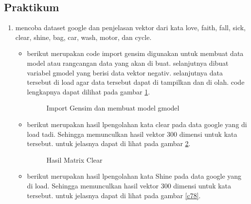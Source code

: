 \subsection{Praktikum}
\begin{enumerate}
\item mencoba dataset google dan penjelasan vektor dari kata love, faith, fall, sick, clear, shine, bag, car, wash, motor, dan cycle.\par

\begin{itemize}
\item berikut merupakan code import gensim digunakan untuk membuat data model atau rangcangan data yang akan di buat. selanjutnya dibuat variabel gmodel yang berisi data vektor negativ. selanjutnya data tersebut di load agar data tersebut dapat di tampilkan dan di olah. code lengkapnya dapat dilihat pada gambar \ref{c89}.

\begin{figure}[!htbp]
      \caption{Import Gensim dan membuat model gmodel}
      \label{c89}
      \end{figure}

\item berikut merupakan hasil lpengolahan kata clear pada data google yang di load tadi. Sehingga memunculkan hasil vektor 300 dimensi untuk kata tersebut. untuk jelasnya dapat di lihat pada gambar \ref{c77}.
\begin{figure}[!htbp]
      \caption{Hasil Matrix Clear}
      \label{c77}
      \end{figure}

\item berikut merupakan hasil lpengolahan kata Shine pada data google yang di load. Sehingga memunculkan hasil vektor 300 dimensi untuk kata tersebut. untuk jelasnya dapat di lihat pada gambar \ref{c78}.


\end{itemize}
\end{enumerate}
